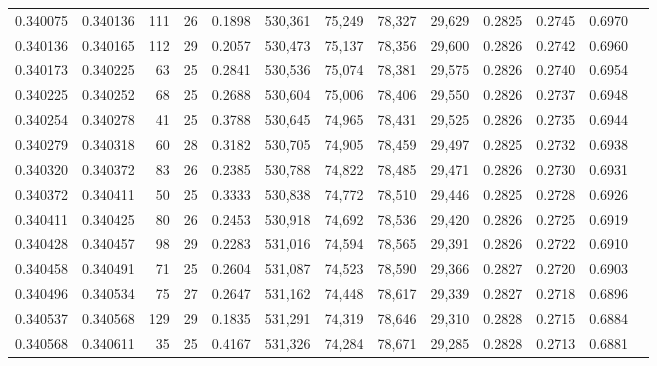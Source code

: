 \begin{tabular}{rrrrrrrrrrrrr}
0.340075 & 0.340136 &   111 &  26 &                                     0.1898 & 530,361 &  75,249 &  78,327 &  29,629 & 0.2825 & 0.2745 & 0.6970 \\
0.340136 & 0.340165 &   112 &  29 &                                     0.2057 & 530,473 &  75,137 &  78,356 &  29,600 & 0.2826 & 0.2742 & 0.6960 \\
0.340173 & 0.340225 &    63 &  25 &                                     0.2841 & 530,536 &  75,074 &  78,381 &  29,575 & 0.2826 & 0.2740 & 0.6954 \\
0.340225 & 0.340252 &    68 &  25 &                                     0.2688 & 530,604 &  75,006 &  78,406 &  29,550 & 0.2826 & 0.2737 & 0.6948 \\
0.340254 & 0.340278 &    41 &  25 &                                     0.3788 & 530,645 &  74,965 &  78,431 &  29,525 & 0.2826 & 0.2735 & 0.6944 \\
0.340279 & 0.340318 &    60 &  28 &                                     0.3182 & 530,705 &  74,905 &  78,459 &  29,497 & 0.2825 & 0.2732 & 0.6938 \\
0.340320 & 0.340372 &    83 &  26 &                                     0.2385 & 530,788 &  74,822 &  78,485 &  29,471 & 0.2826 & 0.2730 & 0.6931 \\
0.340372 & 0.340411 &    50 &  25 &                                     0.3333 & 530,838 &  74,772 &  78,510 &  29,446 & 0.2825 & 0.2728 & 0.6926 \\
0.340411 & 0.340425 &    80 &  26 &                                     0.2453 & 530,918 &  74,692 &  78,536 &  29,420 & 0.2826 & 0.2725 & 0.6919 \\
0.340428 & 0.340457 &    98 &  29 &                                     0.2283 & 531,016 &  74,594 &  78,565 &  29,391 & 0.2826 & 0.2722 & 0.6910 \\
0.340458 & 0.340491 &    71 &  25 &                                     0.2604 & 531,087 &  74,523 &  78,590 &  29,366 & 0.2827 & 0.2720 & 0.6903 \\
0.340496 & 0.340534 &    75 &  27 &                                     0.2647 & 531,162 &  74,448 &  78,617 &  29,339 & 0.2827 & 0.2718 & 0.6896 \\
0.340537 & 0.340568 &   129 &  29 &                                     0.1835 & 531,291 &  74,319 &  78,646 &  29,310 & 0.2828 & 0.2715 & 0.6884 \\
0.340568 & 0.340611 &    35 &  25 &                                     0.4167 & 531,326 &  74,284 &  78,671 &  29,285 & 0.2828 & 0.2713 & 0.6881 \\

\end{tabular}
